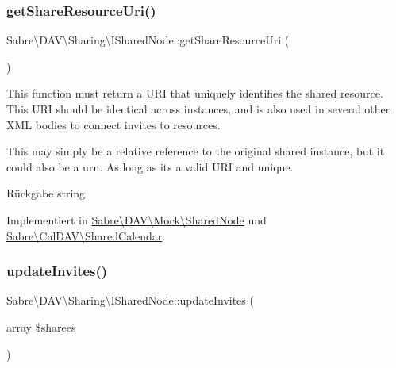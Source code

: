 \subsubsection{\texorpdfstring{get\+Share\+Resource\+Uri()}{getShareResourceUri()}}
{\footnotesize\ttfamily Sabre\textbackslash{}\+D\+A\+V\textbackslash{}\+Sharing\textbackslash{}\+I\+Shared\+Node\+::get\+Share\+Resource\+Uri (\begin{DoxyParamCaption}{ }\end{DoxyParamCaption})}

This function must return a U\+RI that uniquely identifies the shared resource. This U\+RI should be identical across instances, and is also used in several other X\+ML bodies to connect invites to resources.

This may simply be a relative reference to the original shared instance, but it could also be a urn. As long as it\textquotesingle{}s a valid U\+RI and unique.

\begin{DoxyReturn}{Rückgabe}
string 
\end{DoxyReturn}


Implementiert in \mbox{\hyperlink{class_sabre_1_1_d_a_v_1_1_mock_1_1_shared_node_a428e362da7ce65a09585099b1b61065f}{Sabre\textbackslash{}\+D\+A\+V\textbackslash{}\+Mock\textbackslash{}\+Shared\+Node}} und \mbox{\hyperlink{class_sabre_1_1_cal_d_a_v_1_1_shared_calendar_a0c3380bdb7a9c6e9f7c347477e7d0dd9}{Sabre\textbackslash{}\+Cal\+D\+A\+V\textbackslash{}\+Shared\+Calendar}}.

\mbox{\label{interface_sabre_1_1_d_a_v_1_1_sharing_1_1_i_shared_node_a76948a1464503ea23d3dd8ff51b561ce}} 
\subsubsection{\texorpdfstring{update\+Invites()}{updateInvites()}}
{\footnotesize\ttfamily Sabre\textbackslash{}\+D\+A\+V\textbackslash{}\+Sharing\textbackslash{}\+I\+Shared\+Node\+::update\+Invites (\begin{DoxyParamCaption}\item[{array}]{\$sharees }\end{DoxyParamCaption})}

